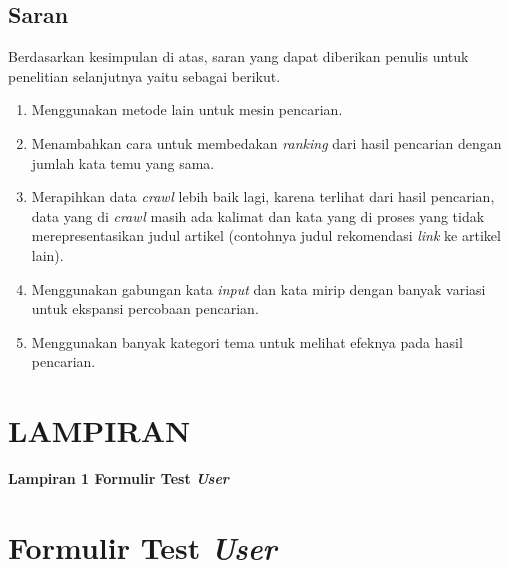 \documentclass[12pt]{report}
\begin{document}
\subsection{Saran}
Berdasarkan kesimpulan di atas, saran yang dapat diberikan penulis untuk penelitian selanjutnya yaitu sebagai berikut.
\begin{enumerate}
\item Menggunakan metode lain untuk mesin pencarian.
\item Menambahkan cara untuk membedakan \textit{ranking} dari hasil pencarian dengan jumlah kata temu yang sama.
\item Merapihkan data \textit{crawl} lebih baik lagi, karena terlihat dari hasil pencarian, data yang di \textit{crawl} masih ada kalimat dan kata yang di proses yang tidak merepresentasikan judul artikel (contohnya judul rekomendasi \textit{link} ke artikel lain).
\item Menggunakan gabungan kata \textit{input} dan kata mirip dengan banyak variasi untuk ekspansi percobaan pencarian.
\item Menggunakan banyak kategori tema untuk melihat efeknya pada hasil pencarian.
\end{enumerate}


\cleardoublepage
{}


\begingroup
\thispagestyle{plain}
\setlength{\bibitemsep}{14.5pt}
\linespread{1.1}\selectfont

\endgroup

\linespread{1.6}\selectfont
\cleardoublepage
{}
\thispagestyle{plain}
\section*{LAMPIRAN}
{\parindent0pt \textbf{Lampiran 1 Formulir Test \textit{User}}}
\hfill \break
\section*{Formulir Test \textit{User}}
\setcounter{subsection}{0}
\end{document}
